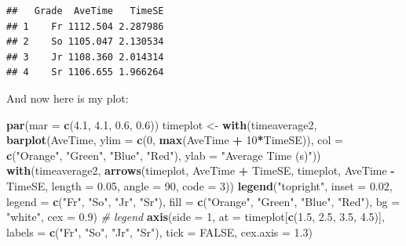 \documentclass[
]{article}
\newenvironment{Shaded}{\begin{snugshade}}{\end{snugshade}}
\newcommand{\CommentTok}[1]{\textcolor[rgb]{0.56,0.35,0.01}{\textit{#1}}}
\newcommand{\DataTypeTok}[1]{\textcolor[rgb]{0.13,0.29,0.53}{#1}}
\newcommand{\DecValTok}[1]{\textcolor[rgb]{0.00,0.00,0.81}{#1}}
\newcommand{\FloatTok}[1]{\textcolor[rgb]{0.00,0.00,0.81}{#1}}
\newcommand{\KeywordTok}[1]{\textcolor[rgb]{0.13,0.29,0.53}{\textbf{#1}}}
\newcommand{\NormalTok}[1]{#1}
\newcommand{\OperatorTok}[1]{\textcolor[rgb]{0.81,0.36,0.00}{\textbf{#1}}}
\newcommand{\OtherTok}[1]{\textcolor[rgb]{0.56,0.35,0.01}{#1}}
\newcommand{\StringTok}[1]{\textcolor[rgb]{0.31,0.60,0.02}{#1}}
\begin{document}
\begin{verbatim}
##   Grade  AveTime   TimeSE
## 1    Fr 1112.504 2.287986
## 2    So 1105.047 2.130534
## 3    Jr 1108.360 2.014314
## 4    Sr 1106.655 1.966264
\end{verbatim}

And now here is my plot:

\begin{Shaded}
\begin{Highlighting}[]
\KeywordTok{par}\NormalTok{(}\DataTypeTok{mar =} \KeywordTok{c}\NormalTok{(}\FloatTok{4.1}\NormalTok{, }\FloatTok{4.1}\NormalTok{, }\FloatTok{0.6}\NormalTok{, }\FloatTok{0.6}\NormalTok{))}
\NormalTok{timeplot <-}\StringTok{ }\KeywordTok{with}\NormalTok{(timeaverage2, }\KeywordTok{barplot}\NormalTok{(AveTime, }\DataTypeTok{ylim =} \KeywordTok{c}\NormalTok{(}\DecValTok{0}\NormalTok{, }\KeywordTok{max}\NormalTok{(AveTime }\OperatorTok{+}\StringTok{ }\DecValTok{10}\OperatorTok{*}\NormalTok{TimeSE)), }\DataTypeTok{col =} \KeywordTok{c}\NormalTok{(}\StringTok{"Orange"}\NormalTok{, }\StringTok{"Green"}\NormalTok{, }\StringTok{"Blue"}\NormalTok{, }\StringTok{"Red"}\NormalTok{), }\DataTypeTok{ylab =} \StringTok{"Average Time (s)"}\NormalTok{))}
\KeywordTok{with}\NormalTok{(timeaverage2, }\KeywordTok{arrows}\NormalTok{(timeplot, AveTime }\OperatorTok{+}\StringTok{ }\NormalTok{TimeSE, timeplot, AveTime }\OperatorTok{-}\StringTok{ }\NormalTok{TimeSE, }\DataTypeTok{length =} \FloatTok{0.05}\NormalTok{, }\DataTypeTok{angle =} \DecValTok{90}\NormalTok{, }\DataTypeTok{code =} \DecValTok{3}\NormalTok{))}
\KeywordTok{legend}\NormalTok{(}\StringTok{"topright"}\NormalTok{, }\DataTypeTok{inset =} \FloatTok{0.02}\NormalTok{, }\DataTypeTok{legend =} \KeywordTok{c}\NormalTok{(}\StringTok{"Fr"}\NormalTok{, }\StringTok{"So"}\NormalTok{, }\StringTok{"Jr"}\NormalTok{, }\StringTok{"Sr"}\NormalTok{), }\DataTypeTok{fill =} \KeywordTok{c}\NormalTok{(}\StringTok{"Orange"}\NormalTok{, }\StringTok{"Green"}\NormalTok{, }\StringTok{"Blue"}\NormalTok{, }\StringTok{"Red"}\NormalTok{), }\DataTypeTok{bg =} \StringTok{"white"}\NormalTok{, }\DataTypeTok{cex =} \FloatTok{0.9}\NormalTok{) }\CommentTok{# legend}
\KeywordTok{axis}\NormalTok{(}\DataTypeTok{side =} \DecValTok{1}\NormalTok{, }\DataTypeTok{at =}\NormalTok{ timeplot[}\KeywordTok{c}\NormalTok{(}\FloatTok{1.5}\NormalTok{, }\FloatTok{2.5}\NormalTok{, }\FloatTok{3.5}\NormalTok{, }\FloatTok{4.5}\NormalTok{)], }\DataTypeTok{labels =} \KeywordTok{c}\NormalTok{(}\StringTok{"Fr"}\NormalTok{, }\StringTok{"So"}\NormalTok{, }\StringTok{"Jr"}\NormalTok{, }\StringTok{"Sr"}\NormalTok{), }\DataTypeTok{tick =} \OtherTok{FALSE}\NormalTok{, }\DataTypeTok{cex.axis =} \FloatTok{1.3}\NormalTok{)}
\end{Highlighting}
\end{Shaded}
\end{document}
